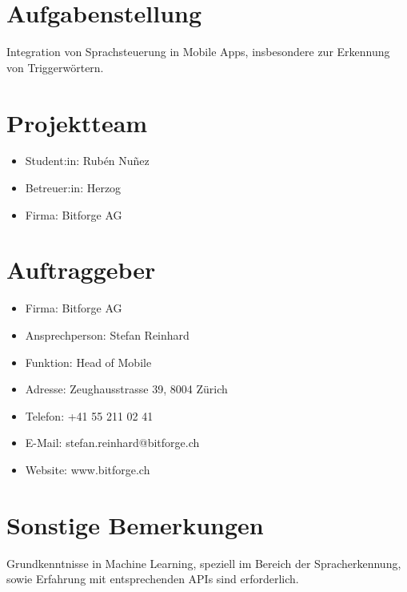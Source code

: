 \documentclass[11pt,a4paper]{article}
\newcommand\blankpage{
	\null
	\thispagestyle{empty}
	\addtocounter{page}{-1}
	\newpage}
\begin{document}


\newpage
\pagecolor{ba-gray}
\afterpage{\nopagecolor}
\blankpage

\newpage

\section*{Aufgabenstellung}
Integration von Sprachsteuerung in Mobile Apps, insbesondere zur Erkennung
von Triggerwörtern.

\section*{Projektteam}
\begin{itemize}
	\item Student:in: Rubén Nuñez
	\item Betreuer:in: Herzog
	\item Firma: Bitforge AG
\end{itemize}

\section*{Auftraggeber}
\begin{itemize}
	\item Firma: Bitforge AG
	\item Ansprechperson: Stefan Reinhard
	\item Funktion: Head of Mobile
	\item Adresse: Zeughausstrasse 39, 8004 Zürich
	\item Telefon: +41 55 211 02 41
	\item E-Mail: stefan.reinhard@bitforge.ch
	\item Website: www.bitforge.ch
\end{itemize}

\section*{Sonstige Bemerkungen}
Grundkenntnisse in Machine Learning, speziell im Bereich der Spracherkennung, sowie
Erfahrung mit entsprechenden APIs sind erforderlich.
\end{document}
